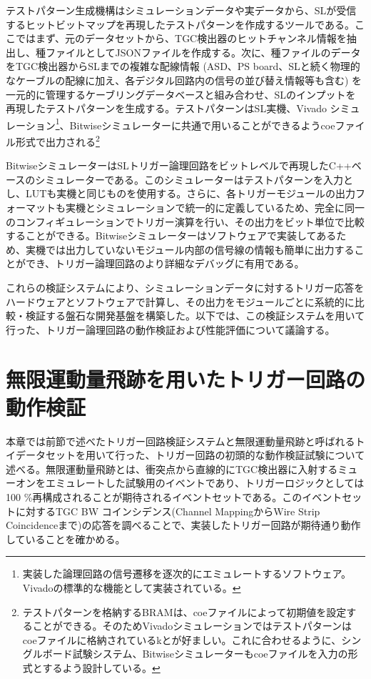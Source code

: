 テストパターン生成機構はシミュレーションデータや実データから、SLが受信するヒットビットマップを再現したテストパターンを作成するツールである。ここではまず、元のデータセットから、TGC検出器のヒットチャンネル情報を抽出し、種ファイルとしてJSONファイルを作成する。次に、種ファイルのデータをTGC検出器からSLまでの複雑な配線情報 (ASD、PS board、SLと続く物理的なケーブルの配線に加え、各デジタル回路内の信号の並び替え情報等も含む) を一元的に管理するケーブリングデータベースと組み合わせ、SLのインプットを再現したテストパターンを生成する。テストパターンはSL実機、Vivado シミュレーション\footnote{実装した論理回路の信号遷移を逐次的にエミュレートするソフトウェア。Vivadoの標準的な機能として実装されている。}、Bitwiseシミュレーターに共通で用いることができるようcoeファイル形式で出力される\footnote{テストパターンを格納するBRAMは、coeファイルによって初期値を設定することができる。そのためVivadoシミュレーションではテストパターンはcoeファイルに格納されているkとが好ましい。これに合わせるように、シングルボード試験システム、Bitwiseシミュレーターもcoeファイルを入力の形式とするよう設計している。}

BitwiseシミュレーターはSLトリガー論理回路をビットレベルで再現したC++ベースのシミュレーターである。このシミュレーターはテストパターンを入力とし、LUTも実機と同じものを使用する。さらに、各トリガーモジュールの出力フォーマットも実機とシミュレーションで統一的に定義しているため、完全に同一のコンフィギュレーションでトリガー演算を行い、その出力をビット単位で比較することができる。Bitwiseシミュレーターはソフトウェアで実装してあるため、実機では出力していないモジュール内部の信号線の情報も簡単に出力することができ、トリガー論理回路のより詳細なデバッグに有用である。

これらの検証システムにより、シミュレーションデータに対するトリガー応答をハードウェアとソフトウェアで計算し、その出力をモジュールごとに系統的に比較・検証する盤石な開発基盤を構築した。以下では、この検証システムを用いて行った、トリガー論理回路の動作検証および性能評価について議論する。




\section{無限運動量飛跡を用いたトリガー回路の動作検証}
\label{sec_IMT}

本章では前節で述べたトリガー回路検証システムと無限運動量飛跡と呼ばれるトイデータセットを用いて行った、トリガー回路の初頭的な動作検証試験について述べる。無限運動量飛跡とは、衝突点から直線的にTGC検出器に入射するミューオンをエミュレートした試験用のイベントであり、トリガーロジックとしては100 \%再構成されることが期待されるイベントセットである。このイベントセットに対するTGC BW コインシデンス(Channel MappingからWire Strip Coincidenceまで)の応答を調べることで、実装したトリガー回路が期待通り動作していることを確かめる。

